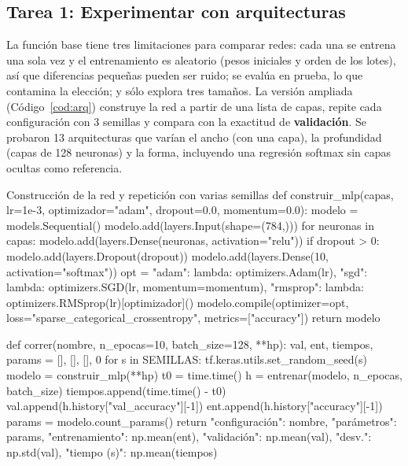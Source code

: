 \documentclass[11pt,letterpaper]{article}
\begin{document}
\subsection{Tarea 1: Experimentar con arquitecturas}

La función base tiene tres limitaciones para comparar redes: cada una se entrena una sola vez y el entrenamiento es aleatorio (pesos iniciales y orden de los lotes), así que diferencias pequeñas pueden ser ruido; se evalúa en prueba, lo que contamina la elección; y sólo explora tres tamaños. La versión ampliada (Código~\ref{cod:arq}) construye la red a partir de una lista de capas, repite cada configuración con 3 semillas y compara con la exactitud de \textbf{validación}. Se probaron 13 arquitecturas que varían el ancho (con una capa), la profundidad (capas de 128 neuronas) y la forma, incluyendo una regresión softmax sin capas ocultas como referencia.

\begin{codigo}[label=cod:arq]{Construcción de la red y repetición con varias semillas}
def construir_mlp(capas, lr=1e-3, optimizador="adam", dropout=0.0, momentum=0.0):
    modelo = models.Sequential()
    modelo.add(layers.Input(shape=(784,)))
    for neuronas in capas:
        modelo.add(layers.Dense(neuronas, activation="relu"))
        if dropout > 0:
            modelo.add(layers.Dropout(dropout))
    modelo.add(layers.Dense(10, activation="softmax"))
    opt = {"adam": lambda: optimizers.Adam(lr),
           "sgd": lambda: optimizers.SGD(lr, momentum=momentum),
           "rmsprop": lambda: optimizers.RMSprop(lr)}[optimizador]()
    modelo.compile(optimizer=opt, loss="sparse_categorical_crossentropy", metrics=["accuracy"])
    return modelo


def correr(nombre, n_epocas=10, batch_size=128, **hp):
    val, ent, tiempos, params = [], [], [], 0
    for s in SEMILLAS:
        tf.keras.utils.set_random_seed(s)
        modelo = construir_mlp(**hp)
        t0 = time.time()
        h = entrenar(modelo, n_epocas, batch_size)
        tiempos.append(time.time() - t0)
        val.append(h.history["val_accuracy"][-1])
        ent.append(h.history["accuracy"][-1])
        params = modelo.count_params()
    return {"configuración": nombre, "parámetros": params, "entrenamiento": np.mean(ent),
            "validación": np.mean(val), "desv.": np.std(val), "tiempo (s)": np.mean(tiempos)}
\end{codigo}
\end{document}
